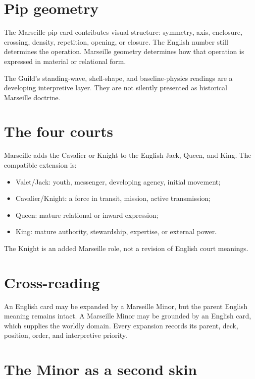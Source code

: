 \section{Pip geometry}

The Marseille pip card contributes visual structure: symmetry, axis, enclosure,
crossing, density, repetition, opening, or closure. The English number still
determines the operation. Marseille geometry determines how that operation is
expressed in material or relational form.

The Guild's standing-wave, shell-shape, and baseline-physics readings are a
developing interpretive layer. They are not silently presented as historical
Marseille doctrine.

\section{The four courts}

Marseille adds the Cavalier or Knight to the English Jack, Queen, and King.
The compatible extension is:

\begin{itemize}
\item Valet/Jack: youth, messenger, developing agency, initial movement;
\item Cavalier/Knight: a force in transit, mission, active transmission;
\item Queen: mature relational or inward expression;
\item King: mature authority, stewardship, expertise, or external power.
\end{itemize}

The Knight is an added Marseille role, not a revision of English court meanings.

\section{Cross-reading}

An English card may be expanded by a Marseille Minor, but the parent English
meaning remains intact. A Marseille Minor may be grounded by an English card,
which supplies the worldly domain. Every expansion records its parent, deck,
position, order, and interpretive priority.

\section{The Minor as a second skin}

